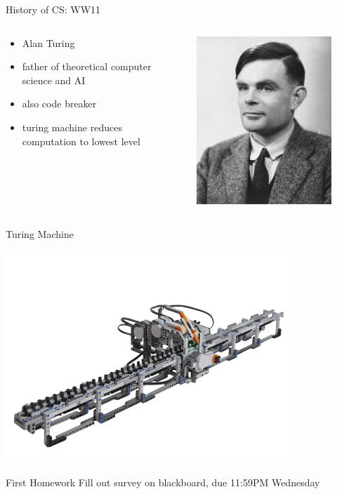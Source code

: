 \documentclass[xcolor={dvipsnames}]{beamer}
\begin{document}
\begin{frame}{History of CS: WW11}
	\begin{columns}
	 \begin{column}{.49\textwidth}
			\begin{itemize}
				\item Alan Turing
				\item father of theoretical computer science and AI
				\item also code breaker
				\item turing machine reduces computation to lowest level
			\end{itemize}
 	\end{column}
	 \begin{column}{.49\textwidth}
  		\begin{figure}
 		\includegraphics{Alan_Turing_photo}
		\end{figure}
	\end{column}
\end{columns}
\end{frame}

\begin{frame}{Turing Machine}
	\begin{center}
	\href{http://vimeo.com/44202270}{\includegraphics[width=0.8\textwidth]{lego_tm}}
	\end{center}
\end{frame}


\begin{frame}{First Homework}
Fill out survey on blackboard, due 11:59PM Wednesday
\end{frame}
\end{document}
